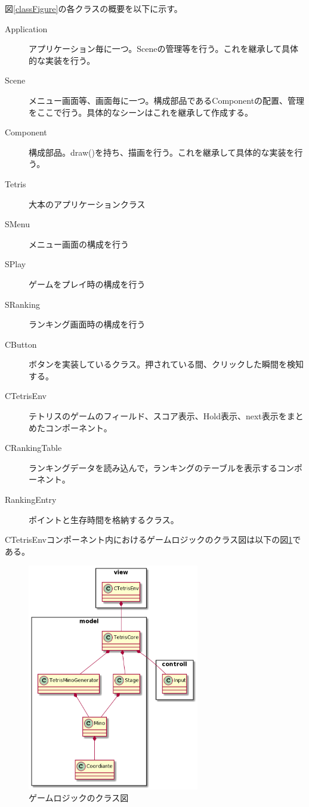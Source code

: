 \documentclass[a4paper,11pt]{jsarticle}
\begin{document}
図\ref{classFigure}の各クラスの概要を以下に示す。
\begin{description}
  \item[Application] アプリケーション毎に一つ。Sceneの管理等を行う。これを継承して具体的な実装を行う。
  \item[Scene] メニュー画面等、画面毎に一つ。構成部品であるComponentの配置、管理をここで行う。具体的なシーンはこれを継承して作成する。
  \item[Component] 構成部品。draw()を持ち、描画を行う。これを継承して具体的な実装を行う。  
  \item[Tetris] 大本のアプリケーションクラス
  \item[SMenu] メニュー画面の構成を行う
  \item[SPlay] ゲームをプレイ時の構成を行う
  \item[SRanking] ランキング画面時の構成を行う
  \item[CButton] ボタンを実装しているクラス。押されている間、クリックした瞬間を検知する。  
  \item[CTetrisEnv] テトリスのゲームのフィールド、スコア表示、Hold表示、next表示をまとめたコンポーネント。
  \item[CRankingTable] ランキングデータを読み込んで，ランキングのテーブルを表示するコンポーネント。
  \item[RankingEntry] ポイントと生存時間を格納するクラス。
  
\end{description}

CTetrisEnvコンポーネント内におけるゲームロジックのクラス図は以下の図\ref{logic}である。
\begin{figure}[htbp]
\begin{center}
\includegraphics[width=75mm]{logic.png}
\caption{ゲームロジックのクラス図}
\label{logic}
\end{center}
\end{figure}
\end{document}
